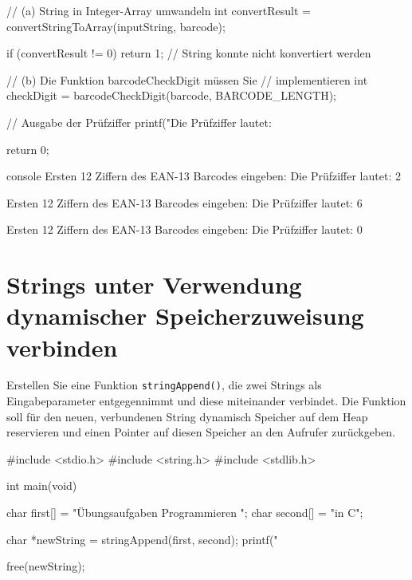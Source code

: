 \begin{enumerate}
\begin{codebox}[lang=c, fontsize=\small]
{    // (a) String in Integer-Array umwandeln
    int convertResult = convertStringToArray(inputString, barcode);

    if (convertResult != 0)
        return 1; // String konnte nicht konvertiert werden

    // (b) Die Funktion barcodeCheckDigit müssen Sie
    //     implementieren
    int checkDigit = barcodeCheckDigit(barcode, BARCODE_LENGTH);

    // Ausgabe der Prüfziffer
    printf("Die Prüfziffer lautet: %

    return 0;
}
\end{codebox}

\begin{mybox}[Bildschirmausgabe]{console}
Ersten 12 Ziffern des EAN-13 Barcodes eingeben:
Die Prüfziffer lautet: 2

Ersten 12 Ziffern des EAN-13 Barcodes eingeben:
Die Prüfziffer lautet: 6

Ersten 12 Ziffern des EAN-13 Barcodes eingeben:
Die Prüfziffer lautet: 0
\end{mybox}

\end{enumerate}




\chapter{Strings unter Verwendung dynamischer Speicherzuweisung verbinden}

\vspace{10pt}

Erstellen Sie eine Funktion \texttt{stringAppend()}, die zwei Strings als
Eingabeparameter entgegennimmt und diese miteinander verbindet. Die Funktion
soll für den neuen, verbundenen String dynamisch Speicher auf dem Heap
reservieren und einen Pointer auf diesen Speicher an den Aufrufer zurückgeben.

\Vorlage
\begin{codebox}[lang=c, fontsize=\small]
#include <stdio.h>
#include <string.h>
#include <stdlib.h>

int main(void) {
    char first[] = "Übungsaufgaben Programmieren ";
    char second[] = "in C";

    char *newString = stringAppend(first, second);
    printf("%

    free(newString);
}
\end{codebox}

